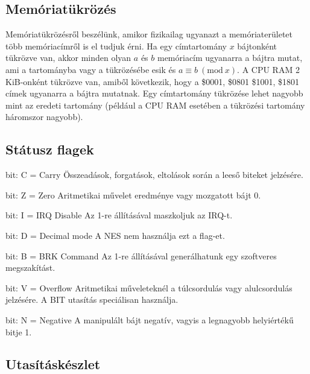 \subsection{Memóriatükrözés \cite{memmirror}}
Memóriatükrözésről beszélünk, amikor fizikailag ugyanazt a memóriaterületet több memóriacímről is el tudjuk érni. Ha egy címtartomány $x$ bájtonként tükrözve van, akkor minden olyan $a$ és $b$ memóriacím ugyanarra a bájtra mutat, ami a tartományba vagy a tükrözésébe esik és $a \equiv b\ (\textrm{mod}\ x)$.  A CPU RAM 2 KiB-onként tükrözve van, amiből következik, hogy a \$0001, \$0801 \$1001, \$1801 címek ugyanarra a bájtra mutatnak. Egy címtartomány tükrözése lehet nagyobb mint az eredeti tartomány (például a CPU RAM esetében a tükrözési tartomány háromszor nagyobb).

\subsection{Státusz flagek}

\begin{compactenum}
	\setcounter{enumi}{-1}
	\item bit: C = Carry \newline Összeadások, forgatások, eltolások során a leeső biteket jelzésére.
	\item bit: Z = Zero   \newline Aritmetikai művelet eredménye vagy mozgatott bájt 0.
	\item bit: I = IRQ Disable
	\newline Az 1-re állításával maszkoljuk az IRQ-t.
	\item bit: D = Decimal mode
	\newline
	A NES nem használja ezt a flag-et.
	\item bit: B = BRK Command
	\newline Az 1-re állításával generálhatunk egy szoftveres megszakítást. 
	\setcounter{enumi}{5}
	\item bit: V = Overflow
	\newline 
	Aritmetikai műveleteknél a túlcsordulás vagy alulcsordulás jelzésére.
	A BIT utasítás speciálisan használja.
	\item bit: N = Negative
	\newline A manipulált bájt negatív, vagyis a legnagyobb helyiértékű bitje 1.
\end{compactenum}

\subsection{Utasításkészlet \cite{6502desc} \cite{6502opc} \cite{6502instr}}
\label{instructionset}

